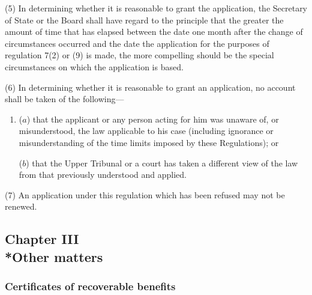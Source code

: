 \documentclass[12pt,a4paper]{article}
\begin{document}
(5) In determining whether it is reasonable to grant the application, the Secretary of State 
or the Board  %
shall have regard to the principle that the greater the amount of time that has elapsed between the date one month after the change of circumstances occurred and the date the application for the purposes of regulation 7(2) 
or (9)  %
is made, the more compelling should be the special circumstances on which the application is based.

(6) In determining whether it is reasonable to grant an application, no account shall be taken of the following—
\begin{enumerate}\item[]
($a$) that the applicant or any person acting for him was unaware of, or misunderstood, the law applicable to his case (including ignorance or misunderstanding of the time limits imposed by these Regulations); or

($b$) that 
the Upper Tribunal  %
or a court has taken a different view of the law from that previously understood and applied.
\end{enumerate}

(7) An application under this regulation which has been refused may not be renewed.


\subsection[Chapter III --- Other matters]{Chapter III\\*Other matters}

\subsubsection[9. Certificates of recoverable benefits]{Certificates of recoverable benefits}
\end{document}
